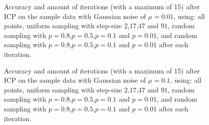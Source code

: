 \documentclass[11pt,a4paper]{article}
\begin{document}
\begin{figure}
\centering

\caption{Accuracy and amount of iterations (with a maximum of 15) after ICP on the sample data with Gaussian noise of $\mu=0.01$, using: all points, uniform sampling with step-size $2$,$17$,$47$ and $91$, random sampling with $p=0.8$,$p=0.5$,$p=0.1$ and $p=0.01$, and random sampling with $p=0.8$,$p=0.5$,$p=0.1$ and $p=0.01$ after each iteration.}
\label{fig:sam2}
\end{figure}

\begin{figure}
\centering

\caption{Accuracy and amount of iterations (with a maximum of 15) after ICP on the sample data with Gaussian noise of $\mu=0.1$, using: all points, uniform sampling with step-size $2$,$17$,$47$ and $91$, random sampling with $p=0.8$,$p=0.5$,$p=0.1$ and $p=0.01$, and random sampling with $p=0.8$,$p=0.5$,$p=0.1$ and $p=0.01$ after each iteration.}
\label{fig:sam3}
\end{figure}
\end{document}
